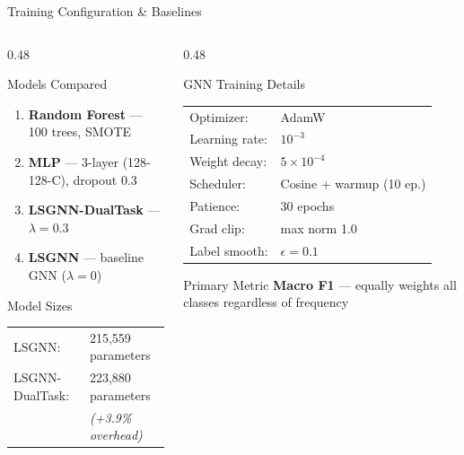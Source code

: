 \documentclass[aspectratio=169, 10pt]{beamer}
\begin{document}
\begin{frame}{Training Configuration \& Baselines}
\begin{columns}[T]
\begin{column}{0.48\textwidth}
\begin{block}{Models Compared}
\begin{enumerate}
    \item \textbf{Random Forest} --- 100 trees, SMOTE
    \item \textbf{MLP} --- 3-layer (128-128-C), dropout 0.3
    \item \textbf{LSGNN-DualTask} --- $\lambda = 0.3$
    \item \textbf{LSGNN} --- baseline GNN ($\lambda = 0$)
\end{enumerate}
\end{block}
\vspace{0.2cm}
\begin{block}{Model Sizes}
\small
\begin{tabular}{ll}
LSGNN: & 215{,}559 parameters \\
LSGNN-DualTask: & 223{,}880 parameters\\
& \textit{(+3.9\% overhead)}\\
\end{tabular}
\end{block}
\end{column}
\begin{column}{0.48\textwidth}
\begin{block}{GNN Training Details}
\small
\begin{tabular}{ll}
Optimizer: & AdamW \\
Learning rate: & $10^{-3}$ \\
Weight decay: & $5 \times 10^{-4}$ \\
Scheduler: & Cosine + warmup (10 ep.)\\
Patience: & 30 epochs \\
Grad clip: & max norm 1.0 \\
Label smooth: & $\epsilon = 0.1$ \\
\end{tabular}
\end{block}
\vspace{0.2cm}
\begin{block}{Primary Metric}
\textbf{Macro F1} --- equally weights all classes regardless of frequency
\end{block}
\end{column}
\end{columns}
\end{frame}
\end{document}
